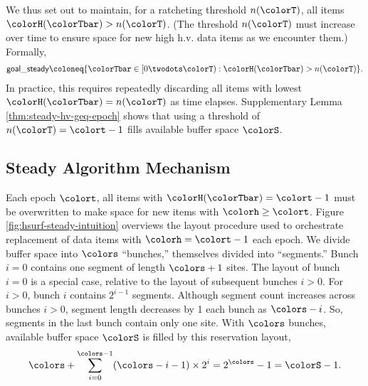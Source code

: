 We thus set out to maintain, for a ratcheting threshold $n(\colorT)$, all items $\colorH(\colorTbar) > n(\colorT)$.
(The threshold $n(\colorT)$ must increase over time to ensure space for new high h.v. data items as we encounter them.)
Formally,
\begin{align*}
\mathsf{goal\_steady}
\coloneq \{
\colorTbar \in [0 \twodots \colorT)
: \colorH(\colorTbar) > n(\colorT)
\}.
\end{align*}
In practice, this requires repeatedly discarding all items with lowest \hv{} $\colorH(\colorTbar) = n(\colorT)$ as time elapses.
Supplementary Lemma \ref{thm:steady-hv-geq-epoch} shows that using a threshold of $n(\colorT) = \colort - 1$ fills available buffer space $\colorS$.%

\subsection{Steady Algorithm Mechanism}
\label{sec:steady-mechanism}



Each epoch $\colort$, all items with $\colorH(\colorTbar) = \colort - 1$ must be overwritten to make space for new items with \hv{} $\colorh \geq \colort$.
Figure \ref{fig:hsurf-steady-intuition} overviews the layout procedure used to orchestrate replacement of data items with \hv{} $\colorh = \colort - 1$ each epoch.
We divide buffer space into $\colors$ ``bunches,'' themselves divided into ``segments.''
Bunch $i=0$ contains one segment of length $\colors + 1$ sites.
The layout of bunch $i=0$ is a special case, relative to the layout of subsequent bunches $i>0$.
For $i > 0$, bunch $i$ contains $2^{i-1}$ segments.
Although segment count increases across bunches $i > 0$, segment length decreases by 1 each bunch as $\colors - i$.
So, segments in the last bunch contain only one site.
With $\colors$ bunches, available buffer space $\colorS$ is filled by this reservation layout,
\begin{align*}
\colors + \sum_{i=0}^{\colors-1} (\colors - i - 1) \times 2^{i} = 2^{\colors} - 1 = \colorS - 1.
\end{align*}

